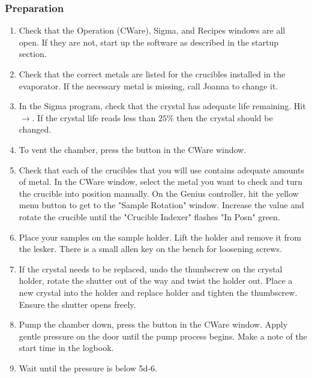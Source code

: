 \subsubsection{Preparation}
\begin{enumerate}
\item Check that the Operation (CWare), Sigma, and Recipes windows are all open. If they are not, start up the
      software as described in the startup section.
\item Check that the correct metals are listed for the crucibles installed in the evaporator. If the
      necessary metal is missing, call Joanna to change it.
\item In the Sigma program, check that the crystal has adequate life remaining. Hit $\rightarrow$. If the crystal life
      reads less than $25\%$ then the crystal should be changed.
\item To vent the chamber, press the  button in the CWare window.
\item Check that each of the crucibles that you will use contains adequate amounts of metal. In the CWare window, select the metal you want to check and turn
      the crucible into position manually. On the Genius controller, hit the yellow menu button to get to the "Sample Rotation" window. Increase the value
      and rotate the crucible until the "Crucible Indexer" flashes "In Posn" green.
\item Place your samples on the sample holder. Lift the holder and remove it from the lesker. There is a small allen key on the bench for loosening screws.
\item If the crystal needs to be replaced, undo the thumbscrew on the crystal holder, rotate the shutter out of the way and twist the holder out.
      Place a new crystal into the holder and replace holder and tighten the thumbscrew. Ensure the shutter opens freely.
\item Pump the chamber down, press the  button in the CWare window. Apply gentle pressure on the door until the pump process begins. Make a note of the start time in the logbook.
\item Wait until the pressure is below \SI{5d-6}{\torr}.
\end{enumerate}
